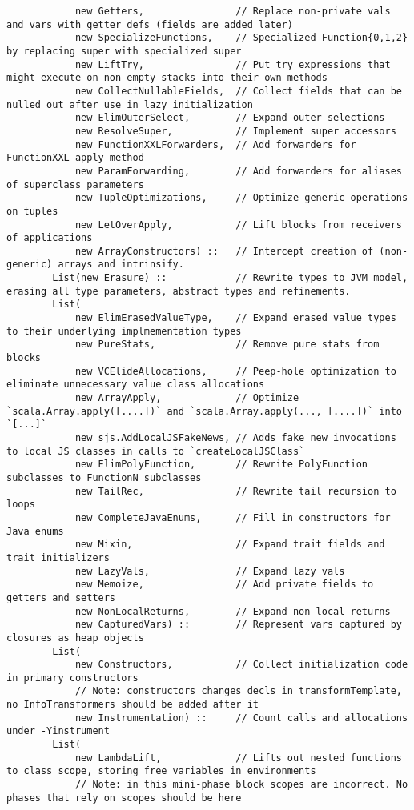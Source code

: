 \documentclass[letterpaper,12pt,titlepage,oneside,final]{book}
\begin{document}
\begin{verbatim}
			new Getters,                // Replace non-private vals and vars with getter defs (fields are added later)
			new SpecializeFunctions,    // Specialized Function{0,1,2} by replacing super with specialized super
			new LiftTry,                // Put try expressions that might execute on non-empty stacks into their own methods
			new CollectNullableFields,  // Collect fields that can be nulled out after use in lazy initialization
			new ElimOuterSelect,        // Expand outer selections
			new ResolveSuper,           // Implement super accessors
			new FunctionXXLForwarders,  // Add forwarders for FunctionXXL apply method
			new ParamForwarding,        // Add forwarders for aliases of superclass parameters
			new TupleOptimizations,     // Optimize generic operations on tuples
			new LetOverApply,           // Lift blocks from receivers of applications
			new ArrayConstructors) ::   // Intercept creation of (non-generic) arrays and intrinsify.
		List(new Erasure) ::            // Rewrite types to JVM model, erasing all type parameters, abstract types and refinements.
		List(
			new ElimErasedValueType,    // Expand erased value types to their underlying implmementation types
			new PureStats,              // Remove pure stats from blocks
			new VCElideAllocations,     // Peep-hole optimization to eliminate unnecessary value class allocations
			new ArrayApply,             // Optimize `scala.Array.apply([....])` and `scala.Array.apply(..., [....])` into `[...]`
			new sjs.AddLocalJSFakeNews, // Adds fake new invocations to local JS classes in calls to `createLocalJSClass`
			new ElimPolyFunction,       // Rewrite PolyFunction subclasses to FunctionN subclasses
			new TailRec,                // Rewrite tail recursion to loops
			new CompleteJavaEnums,      // Fill in constructors for Java enums
			new Mixin,                  // Expand trait fields and trait initializers
			new LazyVals,               // Expand lazy vals
			new Memoize,                // Add private fields to getters and setters
			new NonLocalReturns,        // Expand non-local returns
			new CapturedVars) ::        // Represent vars captured by closures as heap objects
		List(
			new Constructors,           // Collect initialization code in primary constructors
			// Note: constructors changes decls in transformTemplate, no InfoTransformers should be added after it
			new Instrumentation) ::     // Count calls and allocations under -Yinstrument
		List(
			new LambdaLift,             // Lifts out nested functions to class scope, storing free variables in environments
			// Note: in this mini-phase block scopes are incorrect. No phases that rely on scopes should be here

\end{verbatim}
\end{document}
